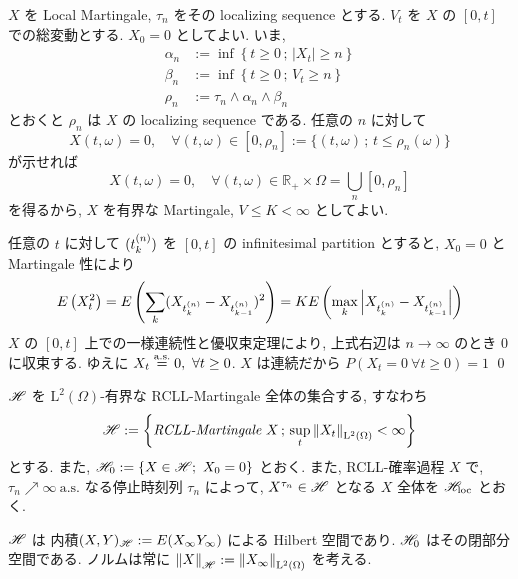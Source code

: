 \documentclass{ltjsarticle}
\begin{document}
\begin{prf}
	\( X \) を Local Martingale, \( \tau_n \) をその localizing sequence とする.
	\( V_t \) を \( X \) の \( [0,t] \) での総変動とする.
	\( X_0 = 0 \) としてよい.
	いま,
	\begin{align*}
		\alpha_n & := \inf \left\{ t \ge 0 \, ; \, | X_t | \ge n \right\}
		\\
		\beta_n  & := \inf \left\{ t \ge 0 \, ; \, V_t \ge n \right\}
		\\
		\rho_n   & := \tau_n \wedge \alpha_n \wedge \beta_n
	\end{align*}
	とおくと \( \rho_n \) は \( X \) の localizing sequence である.
	任意の \( n \) に対して
	\[
		X(t,\omega) = 0,	\quad
		\forall (t,\omega) \in [ 0,\rho_n ] :=
		\{ (t,\omega) \, ; \, t \le \rho_n (\omega) \}
	\]
	が示せれば
	\[
		X(t,\omega) = 0,	\quad
		\forall (t,\omega) \in \mathbb{R}_{ + } \times \Omega
		= \bigcup_n [ 0,\rho_n ]
	\]
	を得るから, \( X \) を有界な Martingale, \( V \le K < \infty \) としてよい.

	任意の \( t \) に対して \( ( t_k^{(n)} ) \) を \( [0,t] \) の infinitesimal partition とすると,
	\( X_0 =0 \) と Martingale 性により
	\[
		E \left(X_t^2 \right)	=	E \left( \sum_k ( X_{ t_k^{(n)} } - X_{ t_{k-1}^{(n)} } )^2 \right)
		=	K E \left( \max_k \left| X_{ t_k^{(n)} } - X_{ t_{k-1}^{(n)} } \right| \right)
	\]
	\( X \) の \( [0,t] \) 上での一様連続性と優収束定理により, 上式右辺は
	\( n \to \infty \) のとき \( 0 \) に収束する.
	ゆえに \( X_t \stackrel{ \text{a.s.} }{ = } 0,\ \forall t \ge 0 \).
	\( X \) は連続だから \( P( X_t = 0 \ \forall t \ge 0 ) = 1 \)
	\qed\end{prf}

\begin{dfn}[空間 \( \Hs \)] \label{space Hs}
	\( \Hs \) を \( \mathrm{L}^2(\Omega) \)-有界な RCLL-Martingale 全体の集合する, すなわち
	\[
		\mathscr{H}	:=	\left\{ \textit{RCLL-Martingale}\ X
		\,;\, \sup_t \left\| X_t \right\|_{\mathrm{L}^2(\Omega)} < \infty \right\}
	\]
	とする.
	また, \( \mathscr{H}_0 := \{ X \in \mathscr{H} ;\,\, X_0 = 0 \} \) とおく.
	また, RCLL-確率過程 \( X \) で, \( \tau_n \nearrow \infty \ \mathrm{a.s.} \)
	なる停止時刻列 \( \tau_n \) によって,
	\( X^{ \tau_n } \in \mathscr{H} \) となる \( X \) 全体を \( \mathscr{H}_{\mathrm{loc}} \) とおく.
\end{dfn}

\begin{prp}
	\( \Hs \) は 内積\( (X,Y)_{\mathscr{H}} := E(X_{\infty}Y_{\infty}) \) による Hilbert 空間であり.
	\( \mathscr{H}_0 \) はその閉部分空間である.
	ノルムは常に \( \left\| X \right\|_{\mathscr{H}} := \left\| X_{\infty} \right\|_{\mathrm{L}^2(\Omega)} \) を考える.
\end{prp}
\end{document}
